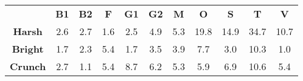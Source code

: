 \begin{tabular}{|c||c|c|c|c|c|c|c|c|c|c|}
	\cline{2-11}
	\multicolumn{1}{c|}{} & \bf{B1} & \bf{B2} & \bf{F} & \bf{G1} & \bf{G2} & \bf{M} & \bf{O} & \bf{S} & \bf{T} & \bf{V} \tabularnewline
	\hhline{-::=:=:=:=:=:=:=:=:=:=:}
	\bf{Harsh} &  2.6 &  2.7 &  1.6 &  2.5 &  4.9 &  5.3 & 19.8 & 14.9 & 34.7 & 10.7 \tabularnewline
	\hline
	\bf{Bright} &  1.7 &  2.3 &  5.4 &  1.7 &  3.5 &  3.9 &  7.7 &  3.0 & 10.3 &  1.0 \tabularnewline
	\hline
	\bf{Crunch} &  2.7 &  1.1 &  5.4 &  8.7 &  6.2 &  5.3 &  5.9 &  6.9 & 10.6 &  5.4 \tabularnewline
	\hline
\end{tabular}
